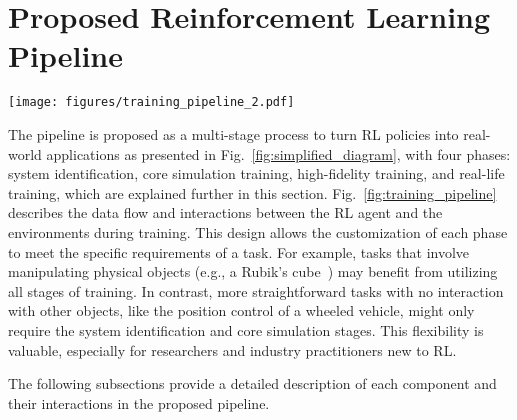 \section{Proposed Reinforcement Learning Pipeline}
\label{sec:pipeline}

\begin{figure*}
    \centering
    \texttt{[image: figures/training\_pipeline\_2.pdf]}
    \caption{The proposed training pipeline involves three stages with increasing levels of complexity from left to right. Each stage is optional and can be revisited with different parameters until they pass a predefined performance criteria. %
    Each stage receives as input a policy and outputs a modified policy, allowing incremental improvement until the final policy is achieved.}
    \label{fig:training_pipeline}
\end{figure*}


The pipeline is proposed as a multi-stage process to turn RL policies into real-world applications as presented in Fig.~\ref{fig:simplified_diagram}, with four phases: system identification, core simulation training, high-fidelity training, and real-life training, which are explained further in this section.
Fig.\ \ref{fig:training_pipeline} describes the data flow and interactions between the RL agent and the environments during training. This design allows the customization of each phase to meet the specific requirements of a task. For example, tasks that involve manipulating physical objects (e.g., a Rubik’s cube~\cite{akkaya2019solving}) may benefit from utilizing all stages of training. In contrast, more straightforward tasks with no interaction with other objects, like the position control of a wheeled vehicle, might only require the system identification and core simulation stages. This flexibility is valuable, especially for researchers and industry practitioners new to RL.

The following subsections provide a detailed description of each component and their interactions in the proposed pipeline.




